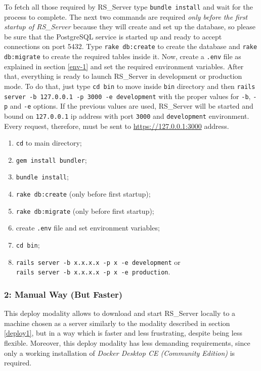 \documentclass[a4paper, english]{article}
\newcounter{subsubsubsection}[subsubsection]
\begin{document}
To fetch all those required by RS\_Server type \verb|bundle install| and wait for the process to complete. The next two commands are required \emph{only before the first startup of RS\_Server} because they will create and set up the database, so please be sure that the PostgreSQL service is started up and ready to accept connections on port 5432. Type \verb|rake db:create| to create the database and \verb|rake db:migrate| to create the required tables inside it. Now, create a \verb|.env| file as explained in section \ref{env-1} and set the required environment variables. After that, everything is ready to launch RS\_Server in development or production mode. To do that, just type \verb|cd bin| to move inside \verb|bin| directory and then \verb|rails server -b 127.0.0.1 -p 3000 -e development| with the proper values for \verb|-b|, \verb|-p| and \verb|-e| options. If the previous values are used, RS\_Server will be started and bound on \verb|127.0.0.1| ip address with port \verb|3000| and \verb|development| environment. Every request, therefore, must be sent to \url{https://127.0.0.1:3000} address.


\begin{enumerate}
\item \verb|cd| to main directory;
\item \verb|gem install bundler|;
\item \verb|bundle install|;
\item \verb|rake db:create| (only before first startup);
\item \verb|rake db:migrate| (only before first startup);
\item create \verb|.env| file and set environment variables;
\item \verb|cd bin|;
\item \verb|rails server -b x.x.x.x -p x -e development| or\\ \verb|rails server -b x.x.x.x -p x -e production|.
\end{enumerate}

\subsubsection{2: Manual Way (But Faster)}

This deploy modality allows to download and start RS\_Server locally to a machine chosen as a server similarly to the modality described in section \ref{deploy1}, but in a way which is faster and less frustrating, despite being less flexible. Moreover, this deploy modality has less demanding requirements, since only a working installation of \emph{Docker Desktop CE (Community Edition)} is required.
\end{document}
